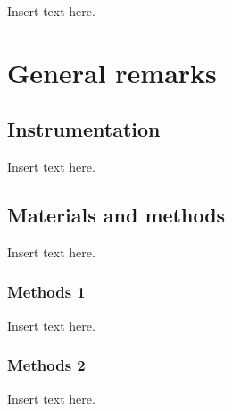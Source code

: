 
Insert text here.

\section{General remarks}
\subsection{Instrumentation}

Insert text here.

\subsection{Materials and methods}

Insert text here.

\subsubsection{Methods 1}

Insert text here.

\subsubsection{Methods 2}

Insert text here.


